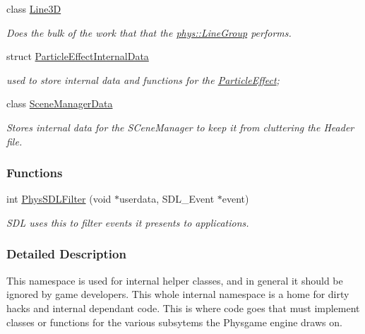 \begin{DoxyCompactItemize}
class \hyperlink{classphys_1_1internal_1_1Line3D}{Line3D}
\begin{DoxyCompactList}\small\item\em Does the bulk of the work that that the \hyperlink{classphys_1_1LineGroup}{phys::LineGroup} performs. \item\end{DoxyCompactList}\item 
struct \hyperlink{structphys_1_1internal_1_1ParticleEffectInternalData}{ParticleEffectInternalData}
\begin{DoxyCompactList}\small\item\em used to store internal data and functions for the \hyperlink{classphys_1_1ParticleEffect}{ParticleEffect}; \item\end{DoxyCompactList}\item 
class \hyperlink{classphys_1_1internal_1_1SceneManagerData}{SceneManagerData}
\begin{DoxyCompactList}\small\item\em Stores internal data for the SCeneManager to keep it from cluttering the Header file. \item\end{DoxyCompactList}\end{DoxyCompactItemize}
\subsubsection*{Functions}
\begin{DoxyCompactItemize}
\item 
int \hyperlink{namespacephys_1_1internal_acd8a05884c6de30dc6db8573d55d1af0}{PhysSDLFilter} (void $\ast$userdata, SDL\_\-Event $\ast$event)
\begin{DoxyCompactList}\small\item\em SDL uses this to filter events it presents to applications. \item\end{DoxyCompactList}\end{DoxyCompactItemize}


\subsubsection{Detailed Description}
This namespace is used for internal helper classes, and in general it should be ignored by game developers. This whole internal namespace is a home for dirty hacks and internal dependant code. This is where code goes that must implement classes or functions for the various subsytems the Physgame engine draws on. 

